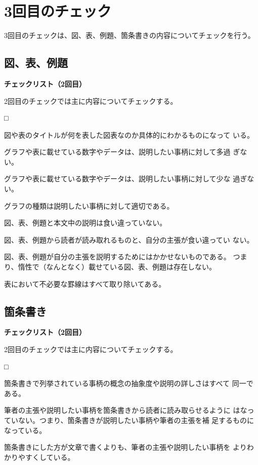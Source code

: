 \documentclass[11pt,a4j]{jsarticle}
\begin{document}
\section{3回目のチェック}

3回目のチェックは、図、表、例題、箇条書きの内容についてチェックを行う。

\subsection{図、表、例題}

\begin{flushleft}
 {\bf チェックリスト（2回目）}
\end{flushleft}
2回目のチェックでは主に内容についてチェックする。
\begin{list}%
 {□} %
 {} %
 \item 図や表のタイトルが何を表した図表なのか具体的にわかるものになって
       いる。
 \item グラフや表に載せている数字やデータは、説明したい事柄に対して多過
       ぎない。
 \item グラフや表に載せている数字やデータは、説明したい事柄に対して少な
       過ぎない。
 \item グラフの種類は説明したい事柄に対して適切である。
 \item 図、表、例題と本文中の説明は食い違っていない。
 \item 図、表、例題から読者が読み取れるものと、自分の主張が食い違ってい
       ない。
 \item 図、表、例題が自分の主張を説明するためにはかかせないものである。
       つまり、惰性で（なんとなく）載せている図、表、例題は存在しない。
 \item 表において不必要な罫線はすべて取り除いてある。
\end{list}

\subsection{箇条書き}

\begin{flushleft}
 {\bf チェックリスト（2回目）}
\end{flushleft}
2回目のチェックでは主に内容についてチェックする。
\begin{list}%
 {□} %
 {} %
 \item 箇条書きで列挙されている事柄の概念の抽象度や説明の詳しさはすべて
       同一である。
 \item 筆者の主張や説明したい事柄を箇条書きから読者に読み取らせるように
       はなっていない。つまり、箇条書きが説明したい事柄や筆者の主張を補
       足するものになっている。
 \item 箇条書きにした方が文章で書くよりも、筆者の主張や説明したい事柄を
       よりわかりやすくしている。
\end{list}
\end{document}
